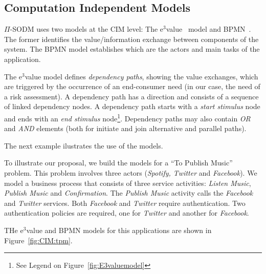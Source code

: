 

\subsection{Computation Independent Models}
$\Pi$-SODM uses two models at the CIM level: The e$^3$value~\cite{e3value} model and BPMN~\cite{BPMN}.
The former identifies the value/information exchange between components of the system.
The BPMN model establishes which are the actors and main tasks of the application.

The e$^3$value model defines \textit{dependency paths}, showing the value exchanges, which are triggered by the occurrence of an end-consumer need (in our case, the need of a risk assessment). 
A dependency path has a direction and consists of a sequence of linked dependency nodes.
A dependency path starts with a \textit{start stimulus} node and ends with an \textit{end stimulus} node\footnote{See Legend on Figure~\ref{fig:E3valuemodel}}. 
Dependency paths may also contain \textsl{OR} and \textsl{AND} elements (both for initiate and join alternative and parallel paths).

The next example ilustrates the use of the models.

\begin{example}\label{ex:toPublicMusic}
To illustrate our proposal, we build the models for a ``To Publish Music'' problem. 
This problem involves three actors ({\em Spotify, Twitter} and {\em Facebook}).
We model a business process that consists of three service activities: {\em Listen Music}, {\em Publish Music} and {\em Confirmation}. 
The {\em Publish Music} activity calls the {\em Facebook} and {\em Twitter} services.
Both {\em Facebook} and {\em Twitter} require authentication. 
Two authentication policies are required, one for {\em Twitter} and another for {\em Facebook}.

THe e$^3$value and BPMN models for this applications are shown in Figure~\ref{fig:CIM:tpm}.
\hfill\openbox
\end{example}

